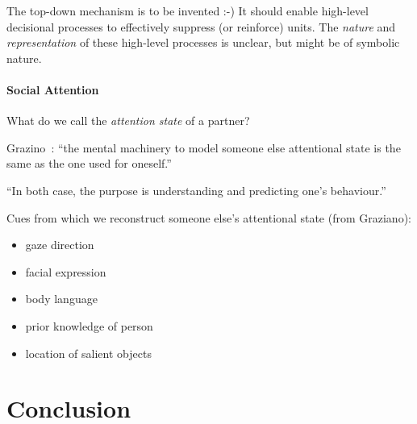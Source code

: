 \documentclass[a4paper]{article}
\begin{document}
The top-down mechanism is to be invented :-)
It should enable high-level decisional processes to effectively suppress (or
reinforce) units. The \emph{nature} and \emph{representation} of these
high-level processes is unclear, but might be of symbolic nature.



\paragraph{Social Attention}

What do we call the \emph{attention state} of a partner?


Grazino~\cite{graziano2013consciousness}: ``the mental machinery to model
someone else attentional state is the same as the one used for oneself.''

``In both case, the purpose is understanding and predicting one's behaviour.''

Cues from which we reconstruct someone else's attentional state (from Graziano):
\begin{itemize}
    \item gaze direction
    \item facial expression
    \item body language
    \item prior knowledge of person
    \item location of salient objects
\end{itemize}


\section{Conclusion}



\end{document}
